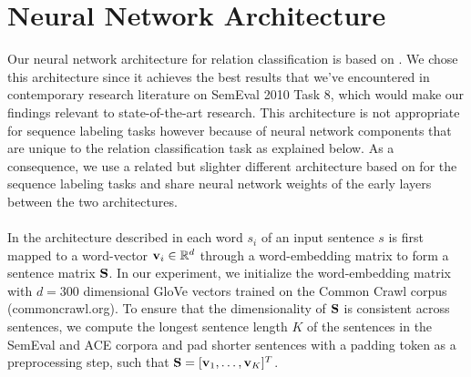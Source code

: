 \section{Neural Network Architecture}
\label{network_architecture}
Our neural network architecture for relation classification is based on \citet{nguyen2015}. We chose this architecture since it achieves the best results that we've encountered in contemporary research literature on SemEval 2010 Task 8, which would make our findings relevant to state-of-the-art research. This architecture is not appropriate for sequence labeling tasks however because of neural network components that are unique to the relation classification task as explained below. As a consequence, we use a related but slighter different architecture based on \citet{collobert2011} for the sequence labeling tasks and share neural network weights of the early layers between the two architectures.
\\\\
In the architecture described in \citet{nguyen2015} each word $s_i$ of an input sentence $s$ is first mapped to a word-vector $\mathbf{v}_i \in \mathbb{R}^d$ through a word-embedding matrix to form a sentence matrix $\mathbf{S}$. In our experiment, we initialize the word-embedding matrix with $d = 300$ dimensional GloVe vectors trained on the Common Crawl corpus (commoncrawl.org). To ensure that the dimensionality of $\mathbf{S}$ is consistent across sentences, we compute the longest sentence length $K$ of the sentences in the SemEval and ACE corpora and pad shorter sentences with a padding token as a preprocessing step, such that $\mathbf{S} = [\mathbf{v}_1, \dots, \mathbf{v}_K]^T$.

